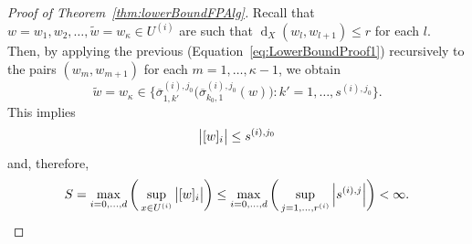 \documentclass[10pt,a4paper]{amsart}
\newcommand{\abs}[1]{{\left\lvert #1 \right \rvert}}
\DeclareMathOperator{\dist}{d}
\newcommand{\distX}[2]{{\dist_X ( #1, #2 )}}
\newcommand{\prn}[1]{{(#1)}}
\begin{document}
\begin{proof}[Proof of Theorem~\ref{thm:lowerBoundFPAlg}]
    Recall that ${w = w_1, w_2, \hdots, \widetilde{w}=w_\kappa \in U^{\prn{i}}}$ are such that ${\distX{w_l}{w_{l+1}} \le r}$ for each ${l}$. 
    Then, by applying the previous (Equation~\eqref{eq:LowerBoundProof1}) recursively to the pairs ${(w_{m}, w_{m+1})}$ for each ${m=1,\hdots,\kappa-1}$, 
    we obtain 
    \begin{equation*}
        \widetilde{w} = w_\kappa \in \Big\{{{\overline{\sigma}}_{1,k'}^{(i),j_0}}\big({\overline{\sigma}}_{k_0,1}^{(i),j_0}(w) \big) \colon k' = 1,\hdots,s^{(i),j_0}  \Big\}.
    \end{equation*}
    This implies 
        \[ \big{\lvert}{ [ w ]_{i}} \big{\rvert}  \le s^{(i),j_0} \]
        and, therefore,
        \begin{equation*}
            S = \max_{i=0,\hdots,d} \bigg(\sup_{x \in U^{(i)}} \big{\lvert}{ [ w ]_{i}} \big{\rvert} \bigg) \le \max_{ i=0,\hdots,d  } \bigg(\sup_{j=1,\hdots,r^{(i)}} \abs{ s^{(i),j} }\bigg)  < \infty . \qedhere
        \end{equation*}
\end{proof}
\end{document}
